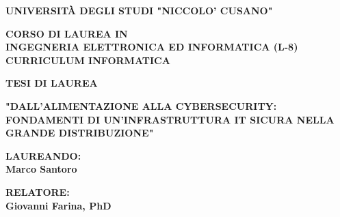 \begin{titlepage}
    \setmainfont{Times New Roman} 
    \begin{center}
        \vspace*{2cm}
        
        {\Large \textbf{UNIVERSITÀ DEGLI STUDI "NICCOLO' CUSANO"}}\\
        \vspace{0.5cm}
        
        {\large \textbf{CORSO DI LAUREA IN \\ INGEGNERIA ELETTRONICA ED INFORMATICA (L-8)\\ CURRICULUM INFORMATICA}}\\
        
        \vspace{3cm}

        {\large \textbf{TESI DI LAUREA}}\\
        
        \vspace{2cm}
        
        {\Large \textbf{"DALL'ALIMENTAZIONE ALLA CYBERSECURITY: FONDAMENTI DI UN'INFRASTRUTTURA IT SICURA NELLA GRANDE DISTRIBUZIONE"}}        
        \vspace{4cm}
        
        
        \begin{minipage}{0.4\textwidth}
        \begin{flushleft} \large
        \textbf{LAUREANDO:}\\ \textbf{Marco Santoro}
        \end{flushleft}
        \end{minipage}
        \begin{minipage}{0.4\textwidth}
        \begin{flushright} \large
        \textbf{RELATORE:} \\
        \textbf{Giovanni Farina, PhD}
        \end{flushright}
        \end{minipage}
        \vfill %
        \vspace*{1cm}
        


\end{center}
\end{titlepage}

